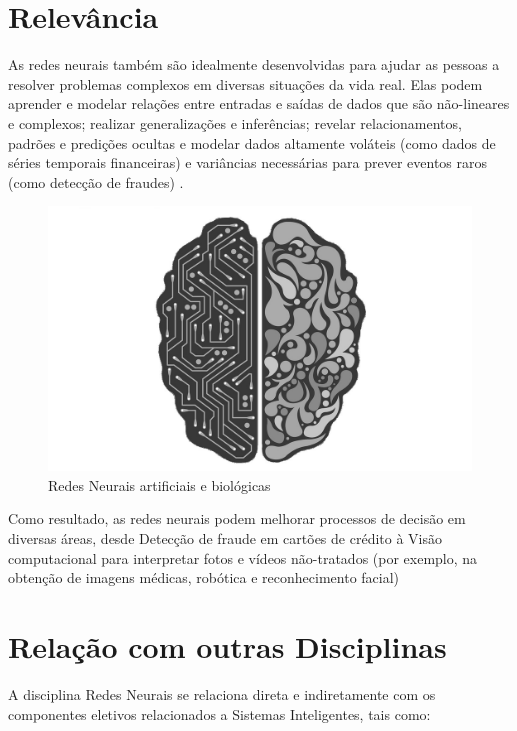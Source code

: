 \documentclass{article}
\begin{document}
\section{Relevância}

As redes neurais também são idealmente desenvolvidas para ajudar as pessoas a resolver problemas complexos em diversas situações da vida real. Elas podem aprender e modelar relações entre entradas e saídas de dados que são não-lineares e complexos; realizar generalizações e inferências; revelar relacionamentos, padrões e predições ocultas e modelar dados altamente voláteis (como dados de séries temporais financeiras) e variâncias necessárias para prever eventos raros (como detecção de fraudes) . \citep{importance}

\begin{figure}[h]
\centering
\includegraphics[scale=0.2]{brain}
\caption{Redes Neurais artificiais e biológicas\citep{figure2}}
\label{figura_2}
\end{figure}

Como resultado, as redes neurais podem melhorar processos de decisão em diversas áreas, desde Detecção de fraude em cartões de crédito à Visão computacional para interpretar fotos e vídeos não-tratados (por exemplo, na obtenção de imagens médicas, robótica e reconhecimento facial)


\section{Relação com outras Disciplinas}

A disciplina Redes Neurais se relaciona direta e indiretamente com os componentes eletivos relacionados a Sistemas Inteligentes, tais como:
\end{document}
